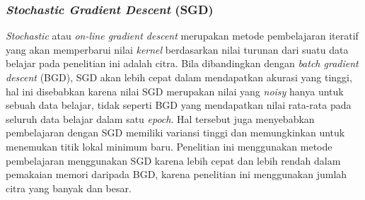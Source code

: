 \subsubsection{\textit{Stochastic Gradient Descent} (SGD)}
\noindent \textit{Stochastic} atau \textit{on-line gradient descent} merupakan metode pembelajaran iteratif yang akan memperbarui nilai \textit{kernel} berdasarkan nilai turunan dari suatu data belajar pada penelitian ini adalah citra. Bila dibandingkan dengan \textit{batch gradient descent} (BGD), SGD akan lebih cepat dalam mendapatkan akurasi yang tinggi, hal ini disebabkan karena nilai SGD merupakan nilai yang \textit{noisy} hanya untuk sebuah data belajar, tidak seperti BGD yang mendapatkan nilai rata-rata pada seluruh data belajar dalam satu \textit{epoch}. Hal tersebut juga menyebabkan pembelajaran dengan SGD memiliki variansi tinggi dan memungkinkan untuk menemukan titik lokal minimum baru. Penelitian ini menggunakan metode pembelajaran menggunakan SGD karena lebih cepat dan lebih rendah dalam pemakaian memori daripada BGD, karena penelitian ini menggunakan jumlah citra yang banyak dan besar.\\

